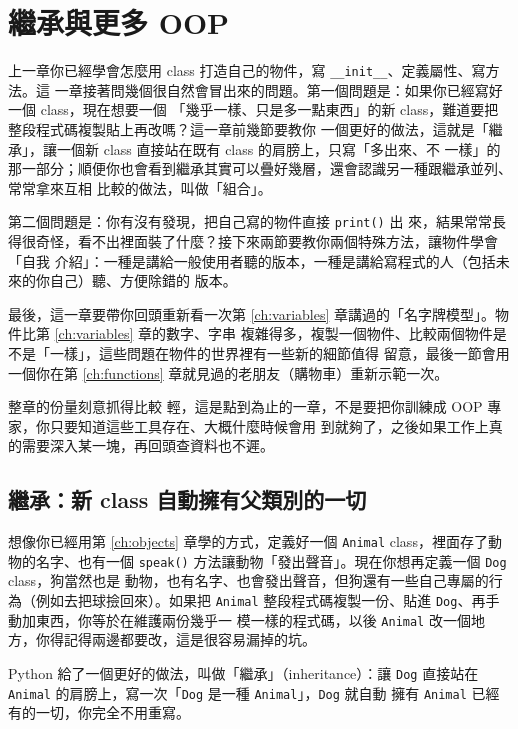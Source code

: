 \chapter{繼承與更多 OOP}
\label{ch:inheritance}

上一章你已經學會怎麼用 class 打造自己的物件，寫 \texttt{\_\_init\_\_}、定義屬性、寫方法。這
一章接著問幾個很自然會冒出來的問題。第一個問題是：如果你已經寫好一個 class，現在想要一個
「幾乎一樣、只是多一點東西」的新 class，難道要把整段程式碼複製貼上再改嗎？這一章前幾節要教你
一個更好的做法，這就是「繼承」，讓一個新 class 直接站在既有 class 的肩膀上，只寫「多出來、不
一樣」的那一部分；順便你也會看到繼承其實可以疊好幾層，還會認識另一種跟繼承並列、常常拿來互相
比較的做法，叫做「組合」。

第二個問題是：你有沒有發現，把自己寫的物件直接 \texttt{print()} 出
來，結果常常長得很奇怪，看不出裡面裝了什麼？接下來兩節要教你兩個特殊方法，讓物件學會「自我
介紹」：一種是講給一般使用者聽的版本，一種是講給寫程式的人（包括未來的你自己）聽、方便除錯的
版本。

最後，這一章要帶你回頭重新看一次第 \ref{ch:variables} 章講過的「名字牌模型」。物件比第 \ref{ch:variables} 章的數字、字串
複雜得多，複製一個物件、比較兩個物件是不是「一樣」，這些問題在物件的世界裡有一些新的細節值得
留意，最後一節會用一個你在第 \ref{ch:functions} 章就見過的老朋友（購物車）重新示範一次。

整章的份量刻意抓得比較
輕，這是點到為止的一章，不是要把你訓練成 OOP 專家，你只要知道這些工具存在、大概什麼時候會用
到就夠了，之後如果工作上真的需要深入某一塊，再回頭查資料也不遲。

\section{繼承：新 class 自動擁有父類別的一切}
\label{sec:inheritance-intro}

想像你已經用第 \ref{ch:objects} 章學的方式，定義好一個 \texttt{Animal} class，裡面存了動物的名字、也有一個
\texttt{speak()} 方法讓動物「發出聲音」。現在你想再定義一個 \texttt{Dog} class，狗當然也是
動物，也有名字、也會發出聲音，但狗還有一些自己專屬的行為（例如去把球撿回來）。如果把
\texttt{Animal} 整段程式碼複製一份、貼進 \texttt{Dog}、再手動加東西，你等於在維護兩份幾乎一
模一樣的程式碼，以後 \texttt{Animal} 改一個地方，你得記得兩邊都要改，這是很容易漏掉的坑。

Python 給了一個更好的做法，叫做「繼承」（inheritance）：讓 \texttt{Dog} 直接站在
\texttt{Animal} 的肩膀上，寫一次「\texttt{Dog} 是一種 \texttt{Animal}」，\texttt{Dog} 就自動
擁有 \texttt{Animal} 已經有的一切，你完全不用重寫。

